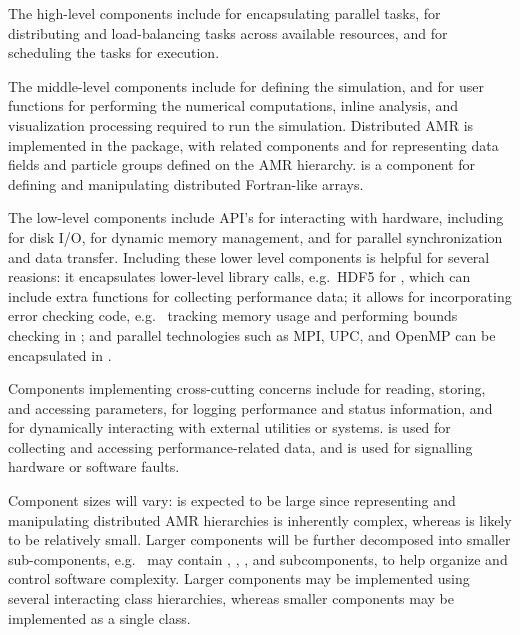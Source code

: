 \documentclass[10pt]{article}
\begin{document}

The high-level components include  for encapsulating
parallel tasks,  for distributing and load-balancing
tasks across available resources, and  for scheduling
the tasks for execution.

The middle-level components include  for defining the
simulation, and  for user functions for
performing the numerical computations, inline analysis, and
visualization processing required to run the simulation.  Distributed
AMR is implemented in the  package, with related components
 and  for representing data fields and
particle groups defined on the AMR hierarchy.   is a
component for defining and manipulating distributed Fortran-like
arrays.

The low-level components include API's for interacting with hardware,
including  for disk I/O,  for dynamic memory
management, and  for parallel synchronization and data
transfer.  Including these lower level components is helpful for
several reasions: it encapsulates lower-level library calls, e.g.~HDF5
for , which can include extra functions for collecting
performance data; it allows for incorporating error checking code,
e.g.~ tracking memory usage and performing bounds checking in
; and parallel technologies such as MPI, UPC, and OpenMP
can be encapsulated in .

Components implementing cross-cutting concerns include
 for reading, storing, and accessing parameters,
 for logging performance and status information, and
 for dynamically interacting with external utilities or
systems.   is used for collecting and accessing
performance-related data, and  is used for signalling
hardware or software faults.

Component sizes will vary:  is expected to be large since
representing and manipulating distributed AMR hierarchies is
inherently complex, whereas  is likely to be relatively
small.  Larger components will be further decomposed into smaller
sub-components, e.g.~ may contain , ,
, and  subcomponents, to help organize and
control software complexity.  Larger components may be implemented
using several interacting class hierarchies, whereas smaller
components may be implemented as a single class.
\end{document}
